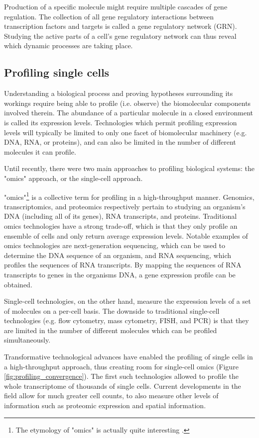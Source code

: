 Production of a specific molecule might require multiple cascades of gene regulation. The collection of all gene regulatory interactions between transcription factors and targets is called a gene regulatory network (GRN). Studying the active parts of a cell's gene regulatory network can thus reveal which dynamic processes are taking place. 

\subsection{Profiling single cells}
Understanding a biological process and proving hypotheses surrounding its workings require being able to profile (i.e. observe) the biomolecular components involved therein. The abundance of a particular molecule in a closed environment is called its expression levels. Technologies which permit profiling expression levels will typically be limited to only one facet of biomolecular machinery (e.g. DNA, RNA, or proteins), and can also be limited in the number of different molecules it can profile.

Until recently, there were two main approaches to profiling biological systems: the "omics" approach, or the single-cell approach.

"omics"\footnote{The etymology of "omics" is actually quite interesting \cite{yadav_wholenesssuffixomics_2007}. } is a collective term for profiling in a high-throughput manner. Genomics, transcriptomics, and proteomics respectively pertain to studying an organism's DNA (including all of its genes), RNA transcripts, and proteins. Traditional omics technologies have a strong trade-off, which is that they only profile an ensemble of cells and only return average expression levels. Notable examples of omics technologies are next-generation sequencing, which can be used to determine the DNA sequence of an organism, and RNA sequencing, which profiles the sequences of RNA transcripts. By mapping the sequences of RNA transcripts to genes in the organisms DNA, a gene expression profile can be obtained.

Single-cell technologies, on the other hand, measure the expression levels of a set of molecules on a per-cell basis. The downside to traditional single-cell technologies (e.g. flow cytometry, mass cytometry, FISH, and PCR) is that they are limited in the number of different molecules which can be profiled simultaneously.

Transformative technological advances have enabled the profiling of single cells in a high-throughput approach, thus creating room for single-cell omics (Figure \ref{fig:profiling_convergence}). The first such technologies allowed to profile the whole transcriptome of thousands of single cells. Current developments in the field allow for much greater cell counts, to also measure other levels of information such as proteomic expression and spatial information. 

